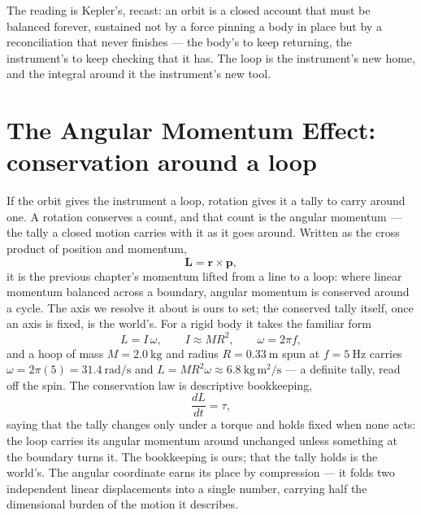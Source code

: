 The reading is Kepler's, recast: an orbit is a closed account that must be balanced forever, sustained not by a
force pinning a body in place but by a reconciliation that never finishes --- the body's to keep returning, the
instrument's to keep checking that it has. The loop is the instrument's new home, and the integral around it
the instrument's new tool.

\section{The Angular Momentum Effect: conservation around a loop}
\label{se:angular-momentum}

If the orbit gives the instrument a loop, rotation gives it a tally to carry around one. A rotation conserves
a count, and that count is the angular momentum --- the tally a closed motion carries with it as it goes
around. Written as the cross product of position and momentum,
\begin{equation}
  \mathbf{L} = \mathbf{r} \times \mathbf{p},
\end{equation}
it is the previous chapter's momentum lifted from a line to a loop: where linear momentum balanced across a
boundary, angular momentum is conserved around a cycle. The axis we resolve it about is ours to set; the
conserved tally itself, once an axis is fixed, is the world's. For a rigid body it takes the familiar form
\begin{equation}
  L = I\,\omega, \qquad I \approx M R^2, \qquad \omega = 2\pi f,
\end{equation}
and a hoop of mass $M = 2.0~\mathrm{kg}$ and radius $R = 0.33~\mathrm{m}$ spun at $f = 5~\mathrm{Hz}$ carries
$\omega = 2\pi(5) = 31.4~\mathrm{rad/s}$ and $L = M R^2 \omega \approx 6.8~\mathrm{kg\,m^2/s}$ --- a definite
tally, read off the spin. The conservation law is descriptive bookkeeping,
\begin{equation}
  \frac{dL}{dt} = \tau,
\end{equation}
saying that the tally changes only under a torque and holds fixed when none acts: the loop carries its
angular momentum around unchanged unless something at the boundary turns it. The bookkeeping is ours; that the
tally holds is the world's. The angular coordinate earns its place by compression --- it folds two independent
linear displacements into a single number, carrying half the dimensional burden of the motion it describes.

